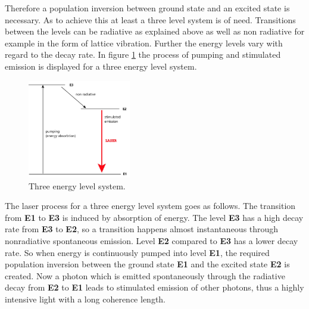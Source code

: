 Therefore a population inversion
between ground state and an excited
state is necessary. As to achieve this at least
a three level system is of need.
Transitions between the levels can be radiative as explained above
as well as non radiative for example in the form of lattice vibration.
Further the energy levels vary with regard
to the decay rate. In figure \ref{fig:3_n} the process of pumping and stimulated emission
is displayed for a three energy level system.
\begin{figure}
  \centering
  \includegraphics[width=0.4\textwidth]{Laser_3_Niveau.jpg}
  \caption{Three energy level system.}
  \label{fig:3_n}
\end{figure}
The laser process for a three energy level system
goes as follows.
The transition from \textbf{E1} to \textbf{E3} is induced
by absorption of energy.
The level \textbf{E3} has a high
decay rate from \textbf{E3} to \textbf{E2},
so a transition happens almost instantaneous
through nonradiative spontaneous emission.
Level \textbf{E2} compared to \textbf{E3}
has a lower decay rate.
So when energy is continuously
pumped into level \textbf{E1},
the required population inversion
between the ground state \textbf{E1} and the
excited state \textbf{E2} is created.
Now a photon which is emitted spontaneously
through the radiative decay from
\textbf{E2} to \textbf{E1}
leads to
stimulated emission of other photons,
thus a highly intensive
light with a long coherence length.

